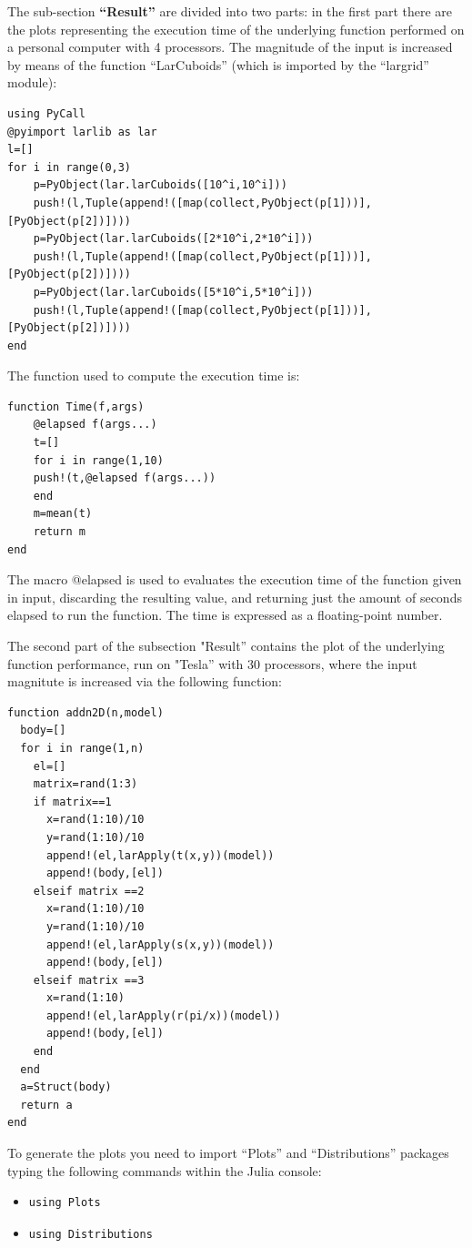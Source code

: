 \documentclass[a4paper,12pt]{article}
\begin{document}
The sub-section \textbf{``Result''} are divided into two parts: in the first part there are the plots representing the execution time of the underlying function performed
on a personal computer with 4 processors. The magnitude of the input is increased by means of the function ``LarCuboids'' (which is imported by the ``largrid'' module):
\begin{Verbatim}[fontsize=\footnotesize]
using PyCall
@pyimport larlib as lar
l=[]
for i in range(0,3)
    p=PyObject(lar.larCuboids([10^i,10^i]))
    push!(l,Tuple(append!([map(collect,PyObject(p[1]))],[PyObject(p[2])])))
    p=PyObject(lar.larCuboids([2*10^i,2*10^i]))
    push!(l,Tuple(append!([map(collect,PyObject(p[1]))],[PyObject(p[2])])))
    p=PyObject(lar.larCuboids([5*10^i,5*10^i]))
    push!(l,Tuple(append!([map(collect,PyObject(p[1]))],[PyObject(p[2])])))
end
\end{Verbatim}
The function used to compute the execution time is:
 \begin{Verbatim}[fontsize=\footnotesize]
function Time(f,args)
    @elapsed f(args...)
    t=[]
    for i in range(1,10)
	push!(t,@elapsed f(args...))
    end
    m=mean(t)
    return m
end
\end{Verbatim}
The macro @elapsed is used to evaluates the execution time of the function given in input, discarding the resulting value, and returning just the amount of seconds elapsed
to run the function. The time is expressed as a floating-point number. 

The second part of the subsection "Result'' contains the plot of the underlying function performance, 
run on "Tesla'' with 30 processors, where the input magnitute is increased via the following function:
\begin{Verbatim}[fontsize=\footnotesize]
function addn2D(n,model)
  body=[]
  for i in range(1,n)
    el=[]
    matrix=rand(1:3)
    if matrix==1
      x=rand(1:10)/10
      y=rand(1:10)/10
      append!(el,larApply(t(x,y))(model))
      append!(body,[el])
    elseif matrix ==2
      x=rand(1:10)/10
      y=rand(1:10)/10
      append!(el,larApply(s(x,y))(model))
      append!(body,[el])
    elseif matrix ==3
      x=rand(1:10)
      append!(el,larApply(r(pi/x))(model))
      append!(body,[el])
    end
  end
  a=Struct(body)
  return a
end
\end{Verbatim}
To generate the plots you need to import ``Plots'' and ``Distributions'' packages typing the following commands within the Julia console:
\begin{itemize}
 \item 
 \begin{Verbatim}[fontsize=\footnotesize]
  using Plots
 \end{Verbatim}
 \item
 \begin{Verbatim}[fontsize=\footnotesize]
  using Distributions
 \end{Verbatim}
\end{itemize}
\newpage
\end{document}
